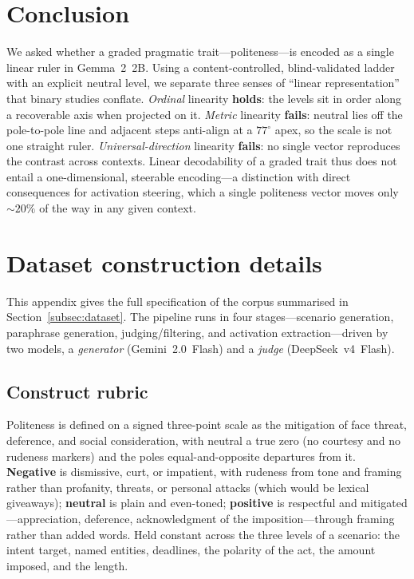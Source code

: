 \documentclass{article}
\begin{document}
\section{Conclusion}\label{sec:conclusion}

We asked whether a graded pragmatic trait---politeness---is encoded as a single
linear ruler in Gemma~2~2B. Using a content-controlled, blind-validated ladder
with an explicit neutral level, we separate three senses of ``linear
representation'' that binary studies conflate. \emph{Ordinal} linearity
\textbf{holds}: the levels sit in order along a recoverable axis when projected on it. \emph{Metric}
linearity \textbf{fails}: neutral lies off the pole-to-pole line and adjacent
steps anti-align at a $77^\circ$ apex, so the scale is not one straight ruler.
\emph{Universal-direction} linearity \textbf{fails}: no single vector reproduces
the contrast across contexts. Linear decodability of a graded trait thus does not
entail a one-dimensional, steerable encoding---a distinction with direct
consequences for activation steering, which a single politeness vector moves only
$\sim$$20\%$ of the way in any given context. 



\appendix
\section{Dataset construction details}
\label{app:dataset}

This appendix gives the full specification of the corpus summarised in
Section~\ref{subsec:dataset}. The pipeline runs in four stages---scenario
generation, paraphrase generation, judging/filtering, and activation
extraction---driven by two models, a \emph{generator} (Gemini~2.0~Flash) and a
\emph{judge} (DeepSeek~v4~Flash).

\subsection{Construct rubric}

Politeness is defined on a signed three-point scale as the mitigation of face
threat, deference, and social consideration, with neutral a true zero (no
courtesy and no rudeness markers) and the poles equal-and-opposite departures
from it. \textbf{Negative} is dismissive, curt, or impatient, with rudeness from
tone and framing rather than profanity, threats, or personal attacks (which would
be lexical giveaways); \textbf{neutral} is plain and even-toned; \textbf{positive}
is respectful and mitigated---appreciation, deference, acknowledgment of the
imposition---through framing rather than added words. Held constant across the
three levels of a scenario: the intent target, named entities, deadlines, the
polarity of the act, the amount imposed, and the length.
\end{document}
